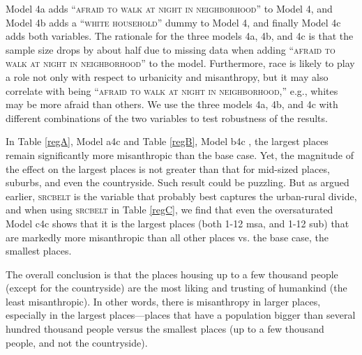 \documentclass[11pt, letterpaper]{article}
\begin{document}
\begin{spacing}{1.4}

Model 4a adds ``\textsc{afraid to walk at night in neighborhood}'' to Model 4,
and Model 4b adds a ``\textsc{white household}'' dummy to Model 4, and finally
Model 4c adds both variables.  The rationale for the three models 4a, 4b, and 4c is
that the sample size drops by about half due to missing data when adding ``\textsc{afraid to walk at night in neighborhood}'' to the model. Furthermore, race is
likely to play a role not only with respect to urbanicity and misanthropy, but it
may also correlate with being ``\textsc{afraid to walk at night in neighborhood},'' e.g., whites may be more afraid than others. We use the three
models 4a, 4b, and 4c with different combinations of the two variables to test robustness of the results. 
%

In Table \ref{regA}, Model a4c and Table \ref{regB}, Model b4c%
, the largest places
remain significantly more misanthropic than the base case. Yet, the magnitude of the effect on the largest places is not greater than that for mid-sized places, suburbs, and even the countryside. Such result could be puzzling.
 But as argued earlier, \textsc{srcbelt} is the variable that probably best
 captures the urban-rural divide, and when using \textsc{srcbelt} in Table
 \ref{regC}, we find that even the oversaturated 
 Model c4c shows that it is the largest places (both 1-12 msa, and 1-12 sub) that are markedly more misanthropic than all other places vs. the base case, the smallest places.

 The overall conclusion is that the places housing up to a few thousand people
 (except for the countryside) are the most liking and trusting of humankind (the least
 misanthropic). In other words, there is misanthropy in larger places, especially in the largest places---places that have a population bigger than several hundred thousand people versus the smallest places (up to a few thousand people, and not the countryside).



\end{spacing}
\end{document}
